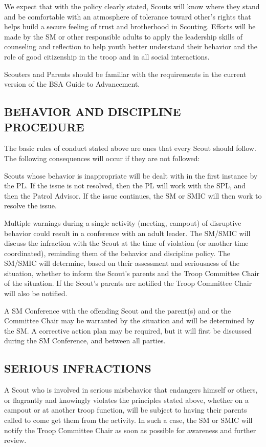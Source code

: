 \documentclass{ltxguide}
\begin{document}
We expect that with the policy clearly stated, Scouts will know where they stand and be comfortable with an atmosphere of tolerance toward other's rights that helps build a secure feeling of trust and brotherhood in Scouting. Efforts will be made by the \ac{SM} or other responsible adults to apply the leadership skills of counseling and reflection to help youth better understand their behavior and the role of good citizenship in the troop and in all social interactions.

Scouters and Parents should be familiar with the requirements in the current version of the \ac{BSA} Guide to Advancement.

\subsection{BEHAVIOR AND DISCIPLINE PROCEDURE}
The basic rules of conduct stated above are ones that every Scout should follow. The following consequences will occur if they are not followed:

Scouts whose behavior is inappropriate will be dealt with in the first instance by the \ac{PL}. If the issue is not resolved, then the \ac{PL} will work with the SPL, and then the Patrol Advisor. If the issue continues, the \ac{SM} or SMIC will then work to resolve the issue.

Multiple warnings during a single activity (meeting, campout) of disruptive behavior could result in a conference with an adult leader. The SM/SMIC will discuss the infraction with the Scout at the time of violation (or another time coordinated), reminding them of the behavior and discipline policy. The SM/SMIC will determine, based on their assessment and seriousness of the situation, whether to inform the Scout's parents and the Troop Committee Chair of the situation. If the Scout's parents are notified the Troop Committee Chair will also be notified.

A \ac{SM} Conference with the offending Scout and the parent(s) and or the Committee Chair may be warranted by the situation and will be determined by the \ac{SM}. A corrective action plan may be required, but it will first be discussed during the \ac{SM} Conference, and between all parties.

\subsection{SERIOUS INFRACTIONS}
A Scout who is involved in serious misbehavior that endangers himself or others, or flagrantly and knowingly violates the principles stated above, whether on a campout or at another troop function, will be subject to having their parents called to come get them from the activity. In such a case, the \ac{SM} or SMIC will notify the Troop Committee Chair as soon as possible for awareness and further review.
\end{document}

